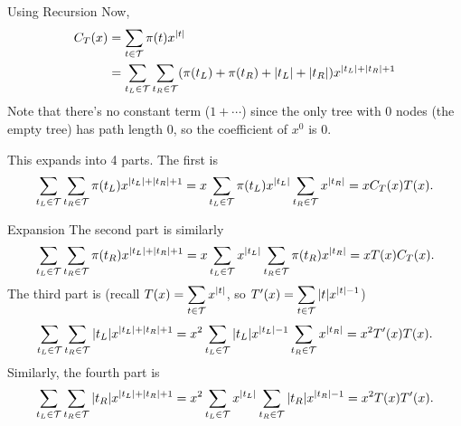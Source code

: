 \documentclass[aspectratio=169]{beamer}
\newcommand{\TT}{\mathcal{T}}
\begin{document}
\begin{frame}{Using Recursion}
  Now,
  \begin{align*}
    C_T(x) &= \sum_{t \in \TT} \pi(t) x^{\abs{t}} \\
    &= \sum_{t_L \in \TT} \sum_{t_R \in \TT} (\pi(t_L) + \pi(t_R) + \abs{t_L} + \abs{t_R}) x^{\abs{t_L} + \abs{t_R} + 1}
  \end{align*}
  Note that there's no constant term ($1 + \cdots$) since the only tree with 0 nodes (the empty tree) has path length 0, so the coefficient of $x^0$ is 0. \pause

  This expands into 4 parts. The first is
  \begin{align*}
    \sum_{t_L \in \TT} \sum_{t_R \in \TT} \pi(t_L) x^{\abs{t_L} + \abs{t_R} + 1}
    = x \sum_{t_L \in \TT} \pi(t_L) x^{\abs{t_L}} \sum_{t_R \in \TT} x^{\abs{t_R}}
    = x C_T(x) T(x).
  \end{align*}
\end{frame}

\begin{frame}{Expansion}
  The second part is similarly
  \begin{align*}
    \sum_{t_L \in \TT} \sum_{t_R \in \TT} \pi(t_R) x^{\abs{t_L} + \abs{t_R} + 1}
    = x \sum_{t_L \in \TT} x^{\abs{t_L}} \sum_{t_R \in \TT} \pi(t_R) x^{\abs{t_R}}
    = x T(x) C_T(x).
  \end{align*} \pause
  The third part is (recall $T(x) = \displaystyle \sum_{t \in \TT} x^{\abs{t}}$, so $T'(x) = \displaystyle \sum_{t \in \TT} \abs{t} x^{\abs{t}-1}$)
  \begin{align*}
    \sum_{t_L \in \TT} \sum_{t_R \in \TT} \abs{t_L} x^{\abs{t_L} + \abs{t_R} + 1} 
    = x^2 \sum_{t_L \in \TT} \abs{t_L} x^{\abs{t_L} - 1} \sum_{t_R \in \TT} x^{\abs{t_R}}
    = x^2 T'(x) T(x).
  \end{align*} \pause
  Similarly, the fourth part is
  \begin{align*}
    \sum_{t_L \in \TT} \sum_{t_R \in \TT} \abs{t_R} x^{\abs{t_L} + \abs{t_R} + 1} 
    = x^2 \sum_{t_L \in \TT} x^{\abs{t_L}} \sum_{t_R \in \TT} \abs{t_R} x^{\abs{t_R} - 1}
    = x^2 T(x) T'(x).
  \end{align*}
\end{frame}
\end{document}
